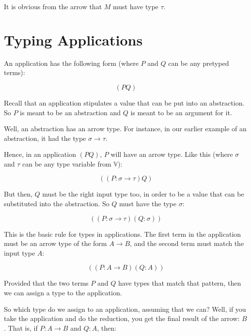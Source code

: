 \documentclass{book}
\numberwithin{equation}{chapter}
\begin{document}
\noindent
It is obvious from the arrow that $M$ must have type $\tau$.


\section{Typing Applications}

An application has the following form (where $P$ and $Q$ can be any pretyped terms):

\begin{equation}
(P Q)
\end{equation}

\noindent
Recall that an application stipulates a value that can be put into an abstraction. So $P$ is meant to be an abstraction and $Q$ is meant to be an argument for it.

Well, an abstraction has an arrow type. For instance, in our earlier example of an abstraction, it had the type $\sigma \rightarrow \tau$. 

Hence, in an application $(P Q)$, $P$ will have an arrow type. Like this (where $\sigma$ and $\tau$ can be any type variable from $\mathbb{V}$):

\begin{equation}
((P : \sigma \rightarrow \tau) Q)
\end{equation}

\noindent
But then, $Q$ must be the right input type too, in order to be a value that can be substituted into the abstraction. So $Q$ must have the type $\sigma$:

\begin{equation}
((P : \sigma \rightarrow \tau) (Q : \sigma))
\end{equation}

\noindent
This is the basic rule for types in applications. The first term in the application must be an arrow type of the form $A \rightarrow B$, and the second term must match the input type $A$:

\begin{equation}
((P : A \rightarrow B) (Q : A))
\end{equation}

\noindent
Provided that the two terms $P$ and $Q$ have types that match that pattern, then we can assign a type to the application. 

So which type do we assign to an application, assuming that we can? Well, if you take the application and do the reduction, you get the final result of the arrow: $B$. That is, if $P : A \rightarrow B$ and $Q : A$, then:
\end{document}
